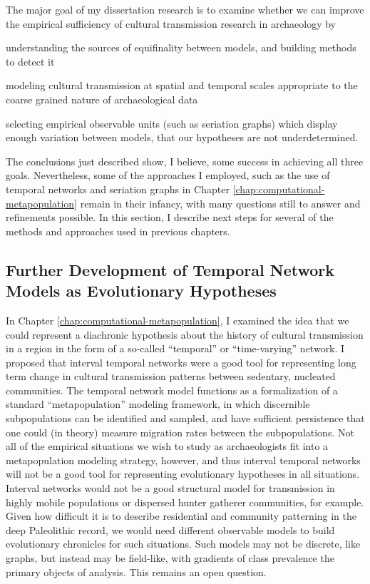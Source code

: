 The major goal of my dissertation research is to examine whether we can improve the empirical sufficiency of cultural transmission research in archaeology by \begin{dissparalist}
\item understanding the sources of equifinality between models, and building methods to detect it
\item modeling cultural transmission at spatial and temporal scales appropriate to the coarse grained nature of archaeological data
\item selecting empirical observable units (such as seriation graphs) which display enough variation between models, that our hypotheses are not underdetermined.
\end{dissparalist}  The conclusions just described show, I believe, some success in achieving all three goals.  Nevertheless, some of the approaches I employed, such as the use of temporal networks and seriation graphs in Chapter \ref{chap:computational-metapopulation} remain in their infancy, with many questions still to answer and refinements possible.  In this section, I describe next steps for several of the methods and approaches used in previous chapters. 

\subsection{Further Development of Temporal Network Models as Evolutionary Hypotheses}\label{conc:sec:future-temporal-networks}

In Chapter \ref{chap:computational-metapopulation}, I examined the idea that we could represent a diachronic hypothesis about the history of cultural transmission in a region in the form of a so-called ``temporal'' or ``time-varying'' network.   
I proposed that interval temporal networks were a good tool for representing long term change in cultural transmission patterns between sedentary, nucleated communities.  The temporal network model functions as a formalization of a standard ``metapopulation'' modeling framework, in which discernible subpopulations can be identified and sampled, and have sufficient persistence that one could (in theory) measure migration rates between the subpopulations.  Not all of the empirical situations we wish to study as archaeologists fit into a metapopulation modeling strategy, however, and thus interval temporal networks will not be a good tool for representing evolutionary hypotheses in all situations.  Interval networks would not be a good structural model for transmission in highly mobile populations or dispersed hunter gatherer communities, for example.  Given how difficult it is to describe residential and community patterning in the deep Paleolithic record, we would need different observable models to build evolutionary chronicles for such situations.  Such models may not be discrete, like graphs, but instead may be field-like, with gradients of class prevalence the primary objects of analysis.  This remains an open question.

